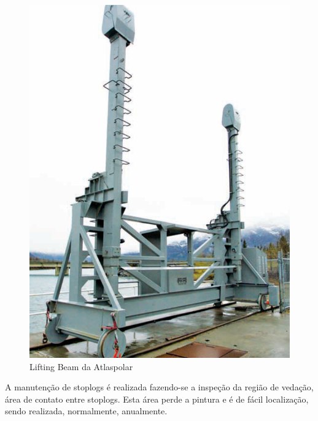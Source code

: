 \begin{figure}[H]
    \centering
    \includegraphics[width=0.5\columnwidth]{figs/pesqbib/10.png}
    \caption{Lifting Beam da Atlaspolar}
    \label{pesqbib_10}
\end{figure}   

A manutenção de stoplogs é realizada fazendo-se a inspeção da região de vedação, área de contato entre stoplogs. Esta área perde a pintura e é de fácil localização, sendo realizada, normalmente, anualmente.
